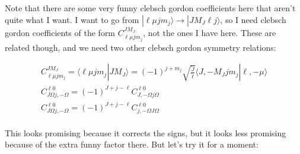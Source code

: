 \documentclass[prl, longbibliography, aps, 10pt]{revtex4-2}
\begin{document}
Note that there are some very funny clebsch gordon coefficients here that aren't quite what I want. I want to go from $|\ell\mu jm_j\rangle\rightarrow|J M_J \ell j\rangle$, so I need clebsch gordon coefficients of the form $C_{\ell \mu j m_j}^{J M_J}$, not the ones I have here. These are related though, and we need two other clebsch gordon symmetry relations:

\begin{equation}
\begin{split}
C_{\ell \mu j m_j}^{J M_J} = \langle\ell \mu j m_j |J M_J \rangle = (-1)^{j+m_j}\sqrt{\frac{\breve{J}}{\breve{\ell}}}\langle J, -M_J j m_j |\ell, -\mu \rangle\\
C_{J\Omega j,-\Omega}^{\ell 0} = (-1)^{J+j-\ell}C_{J,-\Omega j\Omega}^{\ell 0}\\
C_{J\Omega j,-\Omega}^{\ell 0} = (-1)^{J+j-\ell}C_{j,-\Omega J\Omega}^{\ell 0}\\
\end{split}
\end{equation}

This looks promising because it corrects the signs, but it looks less promising because of the extra funny factor there. But let's try it for a moment:
\end{document}
